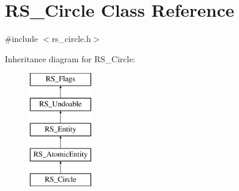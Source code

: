 \hypertarget{classRS__Circle}{\section{R\-S\-\_\-\-Circle Class Reference}
\label{classRS__Circle}
}


{\ttfamily \#include $<$rs\-\_\-circle.\-h$>$}

Inheritance diagram for R\-S\-\_\-\-Circle\-:\begin{figure}[H]
\begin{center}
\leavevmode
\includegraphics[height=5.000000cm]{classRS__Circle}
\end{center}
\end{figure}
